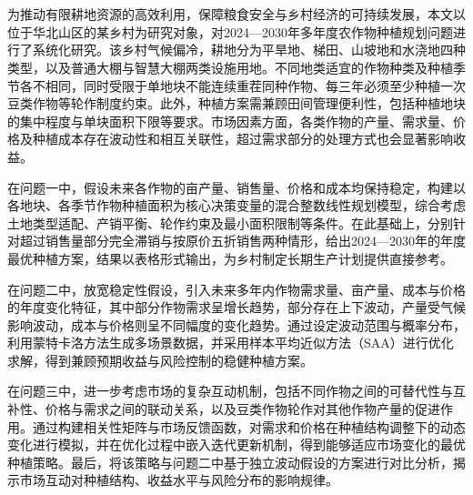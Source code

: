 \begin{cabstract}	%
\vspace*{-2\baselineskip}   %
\begin{center}
  \\[0.8em]
\end{center}

\begin{center}
  \\[0.8em]
\end{center}

为推动有限耕地资源的高效利用，保障粮食安全与乡村经济的可持续发展，本文以位于华北山区的某乡村为研究对象，对2024—2030年多年度农作物种植规划问题进行了系统化研究。该乡村气候偏冷，耕地分为平旱地、梯田、山坡地和水浇地四种类型，以及普通大棚与智慧大棚两类设施用地。不同地类适宜的作物种类及种植季节各不相同，同时受限于单地块不能连续重茬同种作物、每三年必须至少种植一次豆类作物等轮作制度约束。此外，种植方案需兼顾田间管理便利性，包括种植地块的集中程度与单块面积下限等要求。市场因素方面，各类作物的产量、需求量、价格及种植成本存在波动性和相互关联性，超过需求部分的处理方式也会显著影响收益。

在问题一中，假设未来各作物的亩产量、销售量、价格和成本均保持稳定，构建以各地块、各季节作物种植面积为核心决策变量的混合整数线性规划模型，综合考虑土地类型适配、产销平衡、轮作约束及最小面积限制等条件。在此基础上，分别针对超过销售量部分完全滞销与按原价五折销售两种情形，给出2024—2030年的年度最优种植方案，结果以表格形式输出，为乡村制定长期生产计划提供直接参考。

在问题二中，放宽稳定性假设，引入未来多年内作物需求量、亩产量、成本与价格的年度变化特征，其中部分作物需求呈增长趋势，部分存在上下波动，产量受气候影响波动，成本与价格则呈不同幅度的变化趋势。通过设定波动范围与概率分布，利用蒙特卡洛方法生成多场景数据，并采用样本平均近似方法（SAA）进行优化求解，得到兼顾预期收益与风险控制的稳健种植方案。

在问题三中，进一步考虑市场的复杂互动机制，包括不同作物之间的可替代性与互补性、价格与需求之间的联动关系，以及豆类作物轮作对其他作物产量的促进作用。通过构建相关性矩阵与市场反馈函数，对需求和价格在种植结构调整下的动态变化进行模拟，并在优化过程中嵌入迭代更新机制，得到能够适应市场变化的最优种植策略。最后，将该策略与问题二中基于独立波动假设的方案进行对比分析，揭示市场互动对种植结构、收益水平与风险分布的影响规律。
\end{cabstract}

